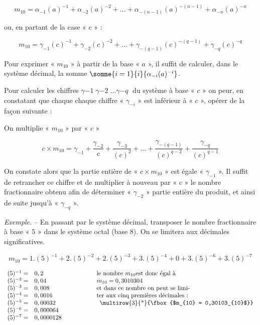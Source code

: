 \[ m_{10} =  \alpha_{-1}(a)^{-1} +  \alpha_{-2}(a)^{-2} +  \ldots + \alpha_{-(n-1)}(a)^{-(n-1)} +  \alpha_{-n}(a)^{-n} \]

ou, en partant de la case « $c$ » :

\[ m_{10} =  \gamma_{-1}(c)^{-1} +  \gamma_{-2}(c)^{-2} +  \ldots + \gamma_{-(q-1)}(c)^{-(q-1)} +  \gamma_{-q}(c)^{-q} \]

Pour exprimer « $m_{10}$ » à partir de la base  « $a$ », il suffit de calculer, dans le système décimal, la somme  $\somme{i=1}{i}{\alpha_{-i}(a)^{-i}}$.

Pour calculer les chiffres $\gamma{-1}\; \gamma{-2}\; \ldots \gamma{-q}\;  $ du système à base « $c$ » on peur, en constatant  
que chaque chaque chiffre « $\gamma_{-i}$ » est inférieur à « $c$ », opérer de la façon suivante : 

On multiplie « $m_{10}$ »  par « $c$ » 

\[ c \times m_{10} = \gamma_{-1} + \dfrac{\gamma_{-2}}{c} +   \dfrac{\gamma_{-3}}{(c)^2}  +   \ldots + \dfrac{\gamma_{-(q-1)}}{(c)^{q-2}} +   \dfrac{\gamma_{-q}}{(c)^{q-1}}  \]

On constate alors que la partie entière de « $c\times m_{10}$ » est égale « $\gamma_{-1}$ ». Il suffit de retrancher ce chiffre et de multiplier à nouveau par « $c$ » le nombre fractionnaire obtenu afin de déterminer « $\gamma_{-2}$ » partie entière du produit, et ainsi de suite jusqu'à « $\gamma_{-q}$ ».

\textsl{Exemple.} -- En passant par le système décimal, transposer le nombre fractionnaire à base  « $5$ »  dans le système octal (base 8). On se limitera aux décimales significatives. 

\[ m_{10} = 1 . (5)^{-1} + 2 . (5)^{-2} + 2 . (5)^{-3} + 3 . (5)^{-4} + 0 + 3 . (5)^{-6} + 3 . (5)^{-7} \] 

\[
\begin{array}{rl@{\hspace*{2cm}}l}
     (5)^{-1} = & 0,2         & \text{le nombre } m_{10} \text{est donc égal à} \\ 
     (5)^{-2} = & 0,04        &  m_{10} = 0,3010304 \\ 
     (5)^{-3} = & 0,008       & \text{et dans ce nombre on peut se limi-} \\ 
     (5)^{-4} = & 0,0016      & \text{ter aux cinq premières décimales : } \\ 
     (5)^{-5} = & 0,00032     & \multicolumn{1}{c}{$\multirow{3}{*}{\fbox{$m_{10} = 0,30103_{10}$}}$}  \\ 
     (5)^{-6} = & 0,000064    &   \\ 
     (5)^{-7} = & 0,0000128   &   \\ 
\end{array}
\]

